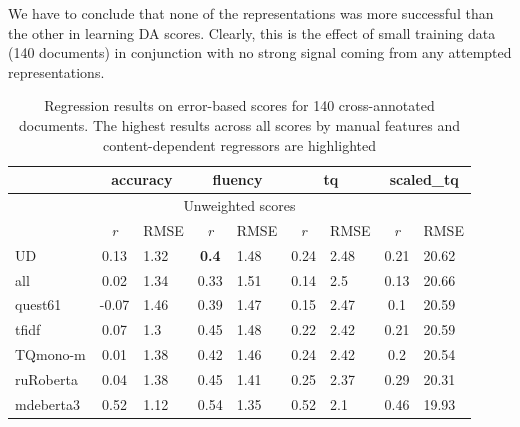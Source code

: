 We have to conclude that none of the representations was more successful than the other in learning DA scores. Clearly, this is the effect of small training data (140 documents) in conjunction with no strong signal coming from any attempted representations. 

\begin{table}[H]
	\centering
	\begin{tabular}{l|cl|cl|cl|cl}
		\toprule
		& \multicolumn{2}{c|}{accuracy} & \multicolumn{2}{c|}{\textbf{fluency}}  & \multicolumn{2}{c|}{tq} & \multicolumn{2}{c}{scaled\_tq}    \\
		\midrule
		\multicolumn{9}{c}{Unweighted scores} \\
		\midrule
		& \textit{r}        & RMSE & \textit{r}       & RMSE & \textit{r}    & RMSE & \textit{r}    & RMSE  \\
		\midrule
		UD                & 0.13  & 1.32 & \textbf{0.4}     & 1.48 & 0.24  & 2.48 & 0.21       & 20.62 \\
		all               & 0.02  & 1.34 & 0.33    & 1.51 & 0.14  & 2.5  & 0.13       & 20.66 \\
		quest61           & -0.07 & 1.46 & 0.39    & 1.47 & 0.15  & 2.47 & 0.1        & 20.59 \\
		\midrule
		tfidf             & 0.07  & 1.3  & 0.45    & 1.48 & 0.22  & 2.42 & 0.21       & 20.59 \\
		TQmono-m          & 0.01  & 1.38 & 0.42    & 1.46 & 0.24  & 2.42 & 0.2        & 20.54 \\
		ruRoberta   & 0.04  & 1.38 & 0.45    & 1.41 & 0.25  & 2.37 & 0.29       & 20.31 \\
		mdeberta3    & 0.52  & 1.12 & \boxit{0.3in}0.54    & 1.35 & 0.52  & 2.1  & 0.46       & 19.93 \\
		\bottomrule
	\end{tabular}
	\caption{\label{tab:err140_res}Regression results on error-based scores for 140 cross-annotated documents. The highest results across all scores by manual features and content-dependent regressors are highlighted}
\end{table}

